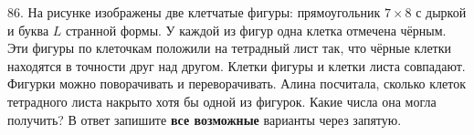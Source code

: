 86. На рисунке изображены две клетчатые фигуры: прямоугольник $7\times8$ с дыркой и буква $L$ странной формы. У каждой из фигур одна клетка отмечена чёрным. Эти фигуры по клеточкам положили на тетрадный лист так, что чёрные клетки находятся в точности друг над другом. Клетки фигуры и клетки листа совпадают. Фигурки можно поворачивать и переворачивать. Алина посчитала, сколько клеток тетрадного листа накрыто хотя бы одной из фигурок. Какие числа она могла получить? В ответ запишите {\bf все возможные} варианты через запятую.
\begin{center}
\begin{figure}[ht!]
\end{figure}
\end{center}

